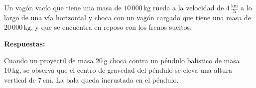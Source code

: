 \documentclass[addpoints]{exam}
\newcommand{\un}[1]{\text{#1}}
\newcommand{\rtas}{\textbf{Respuestas: }}
\begin{document}
\begin{questions}
    \question Un vagón vacío que tiene una masa de $10 \, 000 \, \un{kg}$ rueda a la velocidad de $4 \, \frac{\un{km}}{\un{h}}$ a lo largo de una vía horizontal y choca con un vagón cargado que tiene una masa de $20 \, 000 \, \un{kg}$, y que se encuentra en reposo con los frenos sueltos.


    \rtas 

    \question Cuando un proyectil de masa $20 \, \un{g}$ choca contra un péndulo balístico de masa $10 \, \un{kg}$, se observa que el centro de gravedad del péndulo se eleva una altura vertical de $7 \, \un{cm}$. La bala queda incrustada en el péndulo.

\end{questions}
\end{document}
